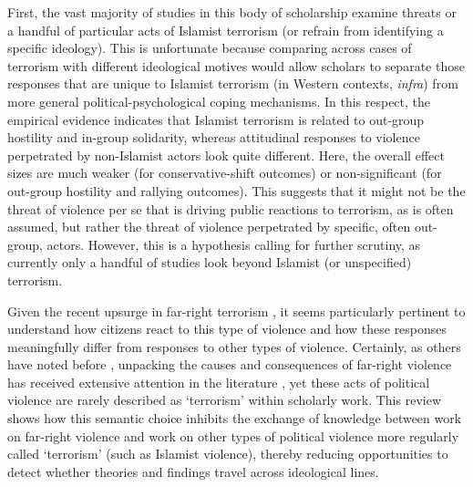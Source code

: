 First, the vast majority of studies in this body of scholarship examine threats or a handful of particular acts of Islamist terrorism (or refrain from identifying a specific ideology). This is unfortunate because comparing across cases of terrorism with different ideological motives would allow scholars to separate those responses that are unique to Islamist terrorism (in Western contexts, \textit{infra}) from more general political-psychological coping mechanisms. In this respect, the empirical evidence indicates that Islamist terrorism is related to out-group hostility and in-group solidarity, whereas attitudinal responses to violence perpetrated by non-Islamist actors look quite different. Here, the overall effect sizes are much weaker (for conservative-shift outcomes) or non-significant (for out-group hostility and rallying outcomes). This suggests that it might not be the threat of violence per se that is driving public reactions to terrorism, as is often assumed, but rather the threat of violence perpetrated by specific, often out-group, actors. However, this is a hypothesis calling for further scrutiny, as currently only a handful of studies look beyond Islamist (or unspecified) terrorism.

Given the recent upsurge in far-right terrorism \citep{TheInstituteForEconomicsAndPeace2019}, it seems particularly pertinent to understand how citizens react to this type of violence and how these responses meaningfully differ from responses to other types of violence. Certainly, as others have noted before \citep{Meier2020b}, unpacking the causes and consequences of far-right violence has received extensive attention in the literature \citep[e.g.,][]{Caiani2012, Koopmans2004, Simpson2018}, yet these acts of political violence are rarely described as ‘terrorism’ within scholarly work. This review shows how this semantic choice inhibits the exchange of knowledge between work on far-right violence and work on other types of political violence more regularly called ‘terrorism’ (such as Islamist violence), thereby reducing opportunities to detect whether theories and findings travel across ideological lines.

